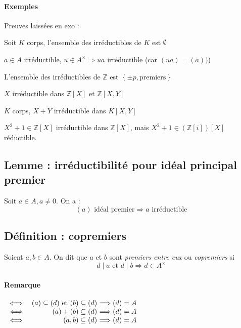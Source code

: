 \documentclass[reqno,a4paper,10pt]{report}
\makeatletter
\newcommand{\set}[1]{\left\lbrace #1 \right\rbrace} %
\newcommand{\IZ}{\ensuremath{\mathbb{Z}}\xspace} %
\newcommand{\so}{\Rightarrow}
\newcommand{\soo}{\Longrightarrow}
\let\olditemize=\itemize%
\renewenvironment{itemize}{%
    \olditemize%
  }{%
    \@noparlisttrue%
    \endlist%
  }%
\makeatother
\begin{document}
\paragraph{Exemples} Preuves laissées en exo :
\begin{itemize}
  \item Soit $K$ corps, l'ensemble des irréductibles de $K$ est $\emptyset$
  \item $a\in A$ irréductible, $u\in A^\times \so ua$ irréductible (car
    $(ua)=(a))$)
  \item L'ensemble des irréductibles de $\IZ$ est $\set{\pm p, \text{
  premiers}}$
  \item $X$ irréductible dans $\IZ[X]$ et $\IZ[X,Y]$
  \item $K$ corps, $X+Y$ irréductible dans $K[X,Y]$
  \item $X^2+1\in \IZ[X]$ irréductible dans $\IZ[X]$, mais $X^2+1 \in
    (\IZ[i])[X]$ réductible.
\begin{comment}
  \item $A$ sous anneau de $B$, alors $a\in A$ irréductible dans $B\so a $
    irréductible dans $A$.
\end{comment}
\end{itemize}

\subsection{Lemme : irréductibilité pour idéal principal premier}
Soit $a\in A, a\neq 0$. On a :
\[(a) \text{ idéal premier} \so a \text{ irréductible}\]
\begin{comment}
  Preuve 25/11/09 p3
\end{comment}

\subsection{Définition : copremiers}
Soient $a,b \in A$. On dit que $a$ et $b$ sont \emph{premiers entre eux} ou
\emph{copremiers} si
\[d \mid a \text{ et } d \mid b \soo d\in A^\times\]
\paragraph{Remarque}
$\begin{array}[t]{rr@{\ }l}
  \iff& (a) \subseteq (d) \text{ et } (b)\subseteq (d) &\soo (d) = A\\
  \iff& (a)+(b)\subseteq (d) &\soo (d)=A\\
  \iff& (a,b)\subseteq (d) &\soo (d)=A
\end{array}$
\end{document}
